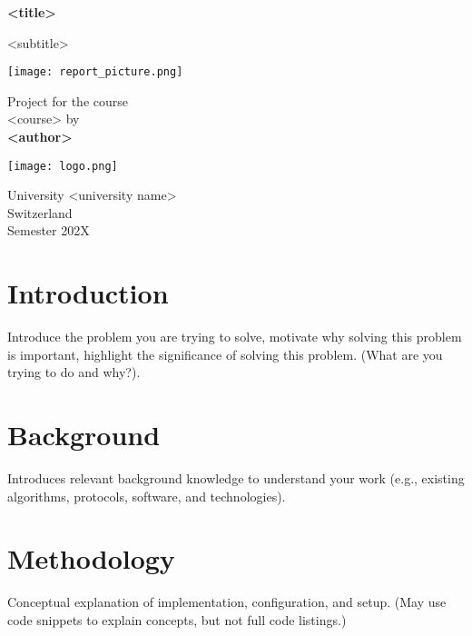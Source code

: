 \documentclass{article} %
\begin{document}
\begin{titlepage}
    \begin{center}
        \vspace*{1cm}

        \Huge
        \textbf{<title>}

        \vspace{0.5cm}
        \LARGE
        <subtitle>

        \vspace{1.5cm}

        \texttt{[image: report\_picture.png]}

        \vspace{1.5cm}

        Project for the course\\
        <course> by\\
        \textbf{<author>}

        \vfill
        \texttt{[image: logo.png]}

        \Large
        University <university name>\\
        Switzerland\\
        Semester 202X

    \end{center}
\end{titlepage}

\tableofcontents
\clearpage

\section{Introduction}
Introduce the problem you are trying to solve, motivate why solving this
problem is important, highlight the significance of solving this problem. (What are you trying to
do and why?).\\
\lipsum[1-1] %

\section{Background}
Introduces relevant background knowledge to understand your work (e.g.,
existing algorithms, protocols, software, and technologies).\\
\lipsum[1-1] %
\clearpage

\section{Methodology}
Conceptual explanation of implementation, configuration, and setup. (May use
code snippets to explain concepts, but not full code listings.)\\
\lipsum[1-2]
\clearpage
\end{document}
